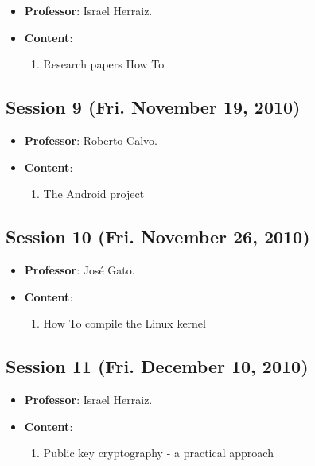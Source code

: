 \documentclass[a4paper]{article}
\begin{document}
\begin{itemize}
 \item \textbf{Professor}: Israel Herraiz.

 \item \textbf{Content}:

 \begin{enumerate}
  \item Research papers How To
 \end{enumerate}

\end{itemize}

\subsection{Session 9 (Fri. November 19, 2010)}

\begin{itemize}
 \item \textbf{Professor}: Roberto Calvo.

 \item \textbf{Content}:

 \begin{enumerate}
  \item The Android project
 \end{enumerate}

\end{itemize}

\subsection{Session 10 (Fri. November 26, 2010)}

\begin{itemize}
 \item \textbf{Professor}: José Gato.

 \item \textbf{Content}:

 \begin{enumerate}
  \item How To compile the Linux kernel
 \end{enumerate}

\end{itemize}

\subsection{Session 11 (Fri. December 10, 2010)}

\begin{itemize}
 \item \textbf{Professor}: Israel Herraiz.

 \item \textbf{Content}:

 \begin{enumerate}
  \item Public key cryptography - a practical approach
 \end{enumerate}

\end{itemize}
\end{document}
